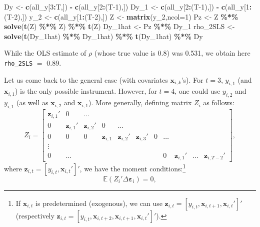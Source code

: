\documentclass[
  12pt,
]{book}
\newenvironment{Shaded}{\begin{snugshade}}{\end{snugshade}}
\newcommand{\AttributeTok}[1]{\textcolor[rgb]{0.13,0.29,0.53}{#1}}
\newcommand{\DecValTok}[1]{\textcolor[rgb]{0.00,0.00,0.81}{#1}}
\newcommand{\FunctionTok}[1]{\textcolor[rgb]{0.13,0.29,0.53}{\textbf{#1}}}
\newcommand{\NormalTok}[1]{#1}
\newcommand{\OtherTok}[1]{\textcolor[rgb]{0.56,0.35,0.01}{#1}}
\newcommand{\SpecialCharTok}[1]{\textcolor[rgb]{0.81,0.36,0.00}{\textbf{#1}}}
\theoremstyle{definition}
\theoremstyle{definition}
\theoremstyle{definition}
\theoremstyle{definition}
\theoremstyle{remark}
\begin{document}
\begin{Shaded}
\begin{Highlighting}[]
\NormalTok{Dy   }\OtherTok{\textless{}{-}} \FunctionTok{c}\NormalTok{(all\_y[}\DecValTok{3}\SpecialCharTok{:}\NormalTok{T,]) }\SpecialCharTok{{-}} \FunctionTok{c}\NormalTok{(all\_y[}\DecValTok{2}\SpecialCharTok{:}\NormalTok{(T}\DecValTok{{-}1}\NormalTok{),])}
\NormalTok{Dy\_1 }\OtherTok{\textless{}{-}} \FunctionTok{c}\NormalTok{(all\_y[}\DecValTok{2}\SpecialCharTok{:}\NormalTok{(T}\DecValTok{{-}1}\NormalTok{),]) }\SpecialCharTok{{-}} \FunctionTok{c}\NormalTok{(all\_y[}\DecValTok{1}\SpecialCharTok{:}\NormalTok{(T}\DecValTok{{-}2}\NormalTok{),])}
\NormalTok{y\_2  }\OtherTok{\textless{}{-}} \FunctionTok{c}\NormalTok{(all\_y[}\DecValTok{1}\SpecialCharTok{:}\NormalTok{(T}\DecValTok{{-}2}\NormalTok{),])}
\NormalTok{Z }\OtherTok{\textless{}{-}} \FunctionTok{matrix}\NormalTok{(y\_2,}\AttributeTok{ncol=}\DecValTok{1}\NormalTok{)}
\NormalTok{Pz }\OtherTok{\textless{}{-}}\NormalTok{ Z }\SpecialCharTok{\%*\%} \FunctionTok{solve}\NormalTok{(}\FunctionTok{t}\NormalTok{(Z) }\SpecialCharTok{\%*\%}\NormalTok{ Z) }\SpecialCharTok{\%*\%} \FunctionTok{t}\NormalTok{(Z)}
\NormalTok{Dy\_1hat }\OtherTok{\textless{}{-}}\NormalTok{ Pz }\SpecialCharTok{\%*\%}\NormalTok{ Dy\_1}
\NormalTok{rho\_2SLS }\OtherTok{\textless{}{-}} \FunctionTok{solve}\NormalTok{(}\FunctionTok{t}\NormalTok{(Dy\_1hat) }\SpecialCharTok{\%*\%}\NormalTok{ Dy\_1hat) }\SpecialCharTok{\%*\%} \FunctionTok{t}\NormalTok{(Dy\_1hat) }\SpecialCharTok{\%*\%}\NormalTok{ Dy}
\end{Highlighting}
\end{Shaded}

While the OLS estimate of \(\rho\) (whose true value is 0.8) was 0.531, we obtain here \texttt{rho\_2SLS} \(=\) 0.89.

Let us come back to the general case (with covariates \(\mathbf{x}_{i,k}\)'s). For \(t=3\), \(y_{i,1}\) (and \(\mathbf{x}_{i,1}\)) is the only possible instrument. However, for \(t=4\), one could use \(y_{i,2}\) and \(y_{i,1}\) (as well as \(\mathbf{x}_{i,2}\) and \(\mathbf{x}_{i,1}\)). More generally, defining matrix \(Z_i\) as follows:
\[
Z_i = \left[
\begin{array}{ccccccccccccccccc}
\mathbf{z}_{i,1}' & 0 & \dots \\
0 & \mathbf{z}_{i,1}' & \mathbf{z}_{i,2}' & 0 & \dots \\
0 &0 &0 & \mathbf{z}_{i,1} & \mathbf{z}_{i,2}' & \mathbf{z}_{i,3}' & 0 & \dots \\
\vdots \\
0 & \dots &&&&&& 0 & \mathbf{z}_{i,1}' &  \dots &   \mathbf{z}_{i,T-2}'
\end{array}
\right],
\]
where \(\mathbf{z}_{i,t} = [y_{i,t},\mathbf{x}_{i,t}']'\), we have the moment conditions:\footnote{If \(\mathbf{x}_{i,t}\) is predetermined (exogenous), we can use \(\mathbf{z}_{i,t} = [y_{i,t},\mathbf{x}_{i,t+1},\mathbf{x}_{i,t}']'\) (respectively \(\mathbf{z}_{i,t} = [y_{i,t},\mathbf{x}_{i,t+2},\mathbf{x}_{i,t+1},\mathbf{x}_{i,t}']'\)).}
\[
\mathbb{E}(Z_i'\Delta  {\boldsymbol\varepsilon}_i)=0,
\]
\end{document}
